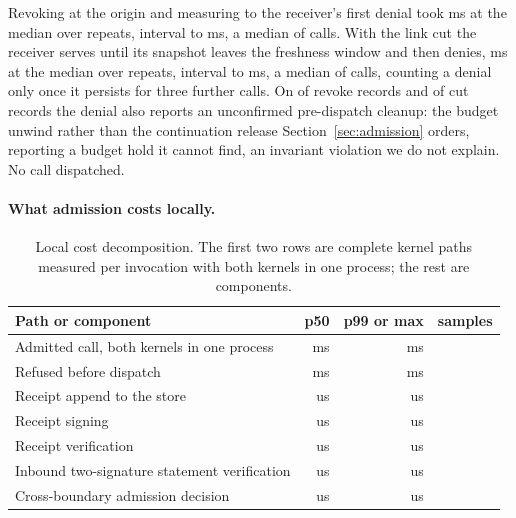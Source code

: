 Revoking at the origin and measuring to the receiver's first denial took
\PSFedRevokeToDenyMs{} ms at the median over \PSFedRevokeRepeats{} repeats,
interval \PSFedRevokeCiLowMs{} to \PSFedRevokeCiHighMs{} ms, a median of
\PSFedRevokeCallsMedian{} calls. With the link cut the receiver serves until its
snapshot leaves the freshness window and then denies, \PSFedCutToDenyMs{} ms at
the median over \PSFedCutRepeats{} repeats, interval \PSFedCutCiLowMs{} to
\PSFedCutCiHighMs{} ms, a median of \PSFedCutCallsMedian{} calls, counting a
denial only once it persists for three further calls. On
\PSFedRevokeAmbiguousReleases{} of \PSFedRevokeDenialRecords{} revoke records
and \PSFedCutAmbiguousReleases{} of \PSFedCutDenialRecords{} cut records the
denial also reports an unconfirmed pre-dispatch cleanup: the budget unwind
rather than the continuation release Section~\ref{sec:admission} orders,
reporting a budget hold it cannot find, an invariant violation we do not
explain. No call dispatched.

\paragraph{What admission costs locally.}
\begin{table}[!tb]
\centering
\small
\caption{Local cost decomposition. The first two rows are complete kernel paths measured per invocation with both kernels in one process; the rest are components.}
\label{tab:local}
\begin{tabular}{@{}lrrr@{}}
\toprule
Path or component & p50 & p99 or max & samples \\
\midrule
Admitted call, both kernels in one process & \PSPredispatchAllowPFiftyMs{} ms & \PSPredispatchAllowPNinetyNineMs{} ms & \PSPredispatchAllowSampleCount{} \\
Refused before dispatch & \PSPredispatchDenyPFiftyMs{} ms & \PSPredispatchDenyPNinetyNineMs{} ms & \PSPredispatchDenySampleCount{} \\
Receipt append to the store & \PSReceiptAppendPFiftyUs{} us & \PSReceiptAppendPNinetyNineUs{} us & \PSReceiptAppendSampleCount{} \\
Receipt signing & \PSReceiptSignPFiftyUs{} us & \PSReceiptSignMaxUs{} us & \PSReceiptSignSampleCount{} \\
Receipt verification & \PSReceiptVerifyPFiftyUs{} us & \PSReceiptVerifyMaxUs{} us & \PSReceiptVerifySampleCount{} \\
Inbound two-signature statement verification & \PSBilateralVerifyPFiftyUs{} us & \PSBilateralVerifyMaxUs{} us & \PSBilateralVerifySampleCount{} \\
Cross-boundary admission decision & \PSCrossBoundaryPFiftyUs{} us & \PSCrossBoundaryMaxUs{} us & \PSCrossBoundarySampleCount{} \\
\bottomrule
\end{tabular}
\end{table}

